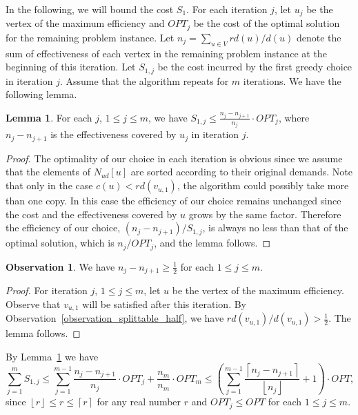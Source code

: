 \documentclass[a4paper,11pt]{article}
\theoremstyle{definition}
\newtheorem{observation}{Observation}
\newtheorem{lemma}[theorem]{Lemma}
\begin{document}
\smallskip

In the following, we will bound the cost $S_1$.
For each iteration $j$, let $u_j$ be the vertex of the maximum efficiency and $OPT_j$ be the cost of the optimal solution for the remaining problem instance. Let $n_j = \sum_{u \in V}rd(u)/d(u)$ denote the sum of effectiveness of each vertex in the remaining problem instance at the beginning of this iteration.
Let $S_{1,j}$ be the cost incurred by the first greedy choice in iteration $j$.
Assume that the algorithm repeats for $m$ iterations. We have the following lemma.

\begin{lemma} \label{lemma_splittable_greedy_choice}
For each $j$, $1 \le j \le m$, we have $S_{1,j} \le \frac{n_j - n_{j+1}}{n_j}\cdot OPT_j$, where $n_j - n_{j+1}$ is the effectiveness covered by $u_j$ in iteration $j$.
\end{lemma}

\begin{proof}
The optimality of our choice in each iteration is obvious since we assume that the elements of $N_{ud}[u]$ are sorted according to their original demands. Note that only in the case $c(u) < rd(v_{u,1})$, the algorithm could possibly take more than one copy. 
In this case the efficiency of our choice remains unchanged since the cost and the effectiveness covered by $u$ grows by the same factor. Therefore the efficiency of our choice, $(n_j - n_{j+1})/S_{1,j}$, is always no less than that of the optimal solution, which is $n_j / OPT_j$, and the lemma follows.
\end{proof}

\begin{observation} \label{observation_splittable_n_decrease}
We have $n_j - n_{j+1} \ge \frac{1}{2}$ for each $1 \le j \le m$.
\end{observation}

\begin{proof}
For iteration $j$, $1\le j\le m$, let $u$ be the vertex of the maximum efficiency. Observe that $v_{u,1}$ will be satisfied after this iteration. By Observation~\ref{observation_splittable_half}, we have $rd(v_{u,1}) / d(v_{u,1}) > \frac{1}{2}$. The lemma follows.
\end{proof}

\smallskip

By Lemma~\ref{lemma_splittable_greedy_choice} we have 
$$\sum_{j=1}^mS_{1,j} \le \sum_{j=1}^{m-1} \frac{n_j - n_{j+1}}{n_j}\cdot OPT_j+ \frac{n_m}{n_m}\cdot OPT_m \le \left(\sum_{j=1}^{m-1} \frac{\left\lceil n_j-n_{j+1}\right\rceil}{\left\lfloor n_j\right\rfloor} + 1\right)\cdot OPT,$$
since $\left\lfloor r\right\rfloor \le r \le \left\lceil r \right\rceil$ for any real number $r$ and $OPT_j \le OPT$ for each $1\le j\le m$.
\end{document}
